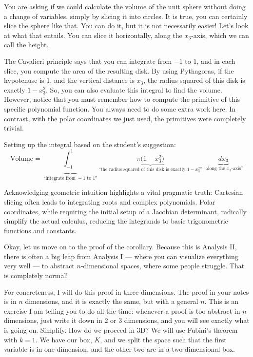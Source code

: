 \begin{spoken-clean}[18:38 - 21:05]
You are asking if we could calculate the volume of the unit sphere without doing a change of variables, simply by slicing it into circles. It is true, you can certainly slice the sphere like that. You can do it, but it is not necessarily easier! Let's look at what that entails. You can slice it horizontally, along the $x_3$-axis, which we can call the height. 

The Cavalieri principle says that you can integrate from $-1$ to $1$, and in each slice, you compute the area of the resulting disk. By using Pythagoras, if the hypotenuse is $1$, and the vertical distance is $x_3$, the radius squared of this disk is exactly $1 - x_3^2$. So, you can also evaluate this integral to find the volume. However, notice that you must remember how to compute the primitive of this specific polynomial function. You always need to do some extra work here. In contrast, with the polar coordinates we just used, the primitives were completely trivial.
\end{spoken-clean}

\begin{math-stroke}
Setting up the integral based on the student's suggestion:
\[
\text{Volume} = \underbrace{\int_{-1}^{1}}_{\text{``integrate from } -1 \text{ to } 1 \text{''}} \underbrace{\pi \big(1 - x_3^2\big)}_{\text{``the radius squared of this disk is exactly } 1 - x_3^2 \text{''}} \, \underbrace{dx_3}_{\text{``along the } x_3 \text{-axis''}}
\]
\end{math-stroke}

\begin{didactic-insight}
Acknowledging geometric intuition highlights a vital pragmatic truth: Cartesian slicing often leads to integrating roots and complex polynomials. Polar coordinates, while requiring the initial setup of a Jacobian determinant, radically simplify the actual calculus, reducing the integrands to basic trigonometric functions and constants.
\end{didactic-insight}

\begin{spoken-clean}[21:05 - 24:15]
Okay, let us move on to the proof of the corollary. Because this is Analysis II, there is often a big leap from Analysis I — where you can visualize everything very well — to abstract $n$-dimensional spaces, where some people struggle. That is completely normal! 

For concreteness, I will do this proof in three dimensions. The proof in your notes is in $n$ dimensions, and it is exactly the same, but with a general $n$. This is an exercise I am telling you to do all the time: whenever a proof is too abstract in $n$ dimensions, just write it down in 2 or 3 dimensions, and you will see exactly what is going on. Simplify. How do we proceed in 3D? We will use Fubini's theorem with $k = 1$. We have our box, $K$, and we split the space such that the first variable is in one dimension, and the other two are in a two-dimensional box.
\end{spoken-clean}

